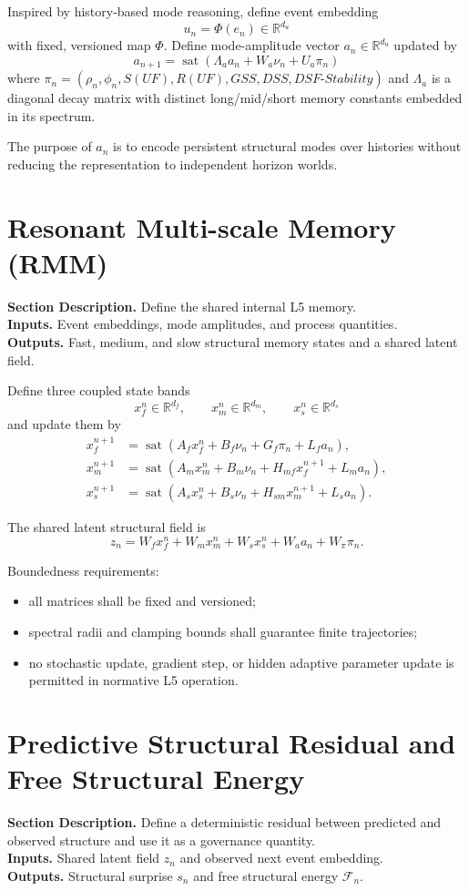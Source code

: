 \documentclass[11pt]{report}
\newcommand{\R}{\mathbb{R}}
\newcommand{\sat}{\operatorname{sat}}
\newcommand{\meta}[3]{\textbf{Section Description.} #1\\
\textbf{Inputs.} #2\\
\textbf{Outputs.} #3\par}
\begin{document}
Inspired by history-based mode reasoning, define event embedding
\[
u_n = \Phi(e_n) \in \R^{d_u}
\]
with fixed, versioned map $\Phi$. Define mode-amplitude vector $a_n\in\R^{d_a}$ updated by
\[
a_{n+1} = \sat(\Lambda_a a_n + W_a \nu_n + U_a \pi_n)
\]
where $\pi_n=(\rho_n,\phi_n,S(UF),R(UF),GSS,DSS,DSF\text{-}Stability)$ and $\Lambda_a$ is a diagonal decay matrix with distinct long/mid/short memory constants embedded in its spectrum.

The purpose of $a_n$ is to encode persistent structural modes over histories without reducing the representation to independent horizon worlds.

\section{Resonant Multi-scale Memory (RMM)}
\meta{Define the shared internal L5 memory.}{Event embeddings, mode amplitudes, and process quantities.}{Fast, medium, and slow structural memory states and a shared latent field.}

Define three coupled state bands
\[
x_f^n\in\R^{d_f},\qquad x_m^n\in\R^{d_m},\qquad x_s^n\in\R^{d_s}
\]
and update them by
\begin{align*}
x_f^{n+1} &= \sat(A_f x_f^n + B_f\nu_n + G_f\pi_n + L_f a_n),\\
x_m^{n+1} &= \sat(A_m x_m^n + B_m\nu_n + H_{mf}x_f^{n+1} + L_m a_n),\\
x_s^{n+1} &= \sat(A_s x_s^n + B_s\nu_n + H_{sm}x_m^{n+1} + L_s a_n).
\end{align*}

The shared latent structural field is
\[
z_n = W_f x_f^n + W_m x_m^n + W_s x_s^n + W_a a_n + W_\pi \pi_n.
\]

Boundedness requirements:
\begin{itemize}
    \item all matrices shall be fixed and versioned;
    \item spectral radii and clamping bounds shall guarantee finite trajectories;
    \item no stochastic update, gradient step, or hidden adaptive parameter update is permitted in normative L5 operation.
\end{itemize}

\section{Predictive Structural Residual and Free Structural Energy}
\meta{Define a deterministic residual between predicted and observed structure and use it as a governance quantity.}{Shared latent field $z_n$ and observed next event embedding.}{Structural surprise $s_n$ and free structural energy $\mathcal{F}_n$.}
\end{document}
